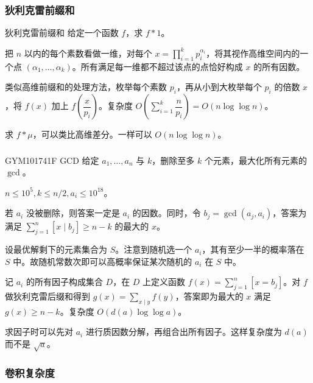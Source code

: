 \documentclass[../main.tex]{subfiles}
\begin{document}
\subsubsection{狄利克雷前缀和}

\begin{frame}{狄利克雷前缀和}
给定一个函数 $f$，求 $f*1$。\pause

把 $n$ 以内的每个素数看做一维，对每个 $x=\prod\limits_{i=1}^kp_i^{\alpha_i}$，将其视作高维空间内的一个点 $(\alpha_1,\dots,\alpha_k)$。所有满足每一维都不超过该点的点恰好构成 $x$ 的所有因数。\pause

类似高维前缀和的处理方法，枚举每个素数 $p_i$，再从小到大枚举每个 $p_i$ 的倍数 $x$，将 $f(x)$ 加上 $f(\dfrac{x}{p_i})$。复杂度 $O(\sum\limits_{i=1}^k\dfrac{n}{p_i})=O(n\log\log n)$。\pause

求 $f*\mu$，可以类比高维差分。一样可以 $O(n\log\log n)$。
\end{frame}

\subsubsection{}

\begin{frame}{GYM101741F GCD}
给定 $a_1,\dots,a_n$ 与 $k$，删除至多 $k$ 个元素，最大化所有元素的 $\gcd$。

$n\le 10^5,k\le n/2,a_i\le 10^{18}$。
\end{frame}

\begin{frame}
若 $a_i$ 没被删除，则答案一定是 $a_i$ 的因数。同时，令 $b_j=\gcd(a_j,a_i)$，答案为满足 $\sum\limits_{j=1}^n[x\mid b_j]\ge n-k$ 的最大的 $x$。\pause

设最优解剩下的元素集合为 $S$。注意到随机选一个 $a_i$，其有至少一半的概率落在 $S$ 中。故随机常数次即可以高概率保证某次随机的 $a_i$ 在 $S$ 中。
\end{frame}

\begin{frame}
记 $a_i$ 的所有因子构成集合 $D$，在 $D$ 上定义函数 $f(x)=\sum\limits_{j=1}^n[x=b_j]$。对 $f$ 做狄利克雷后缀和得到 $g(x)=\sum\limits_{x\mid y}f(y)$，答案即为最大的 $x$ 满足 $g(x)\ge n-k$。复杂度 $O(d(a)\log\log a)$。\pause

求因子时可以先对 $a_i$ 进行质因数分解，再组合出所有因子。这样复杂度为 $d(a)$ 而不是 $\sqrt a$。
\end{frame}

\subsubsection{卷积复杂度}
\end{document}

